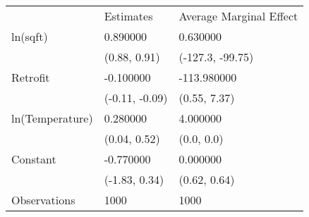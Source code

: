 \begin{tabular}{lll}
 & Estimates & Average Marginal Effect \\
ln(sqft) & 0.890000 & 0.630000 \\
  & (0.88, 0.91) & (-127.3, -99.75) \\
Retrofit & -0.100000 & -113.980000 \\
  & (-0.11, -0.09) & (0.55, 7.37) \\
ln(Temperature) & 0.280000 & 4.000000 \\
  & (0.04, 0.52) & (0.0, 0.0) \\
Constant & -0.770000 & 0.000000 \\
  & (-1.83, 0.34) & (0.62, 0.64) \\
Observations & 1000 & 1000 \\
\end{tabular}

